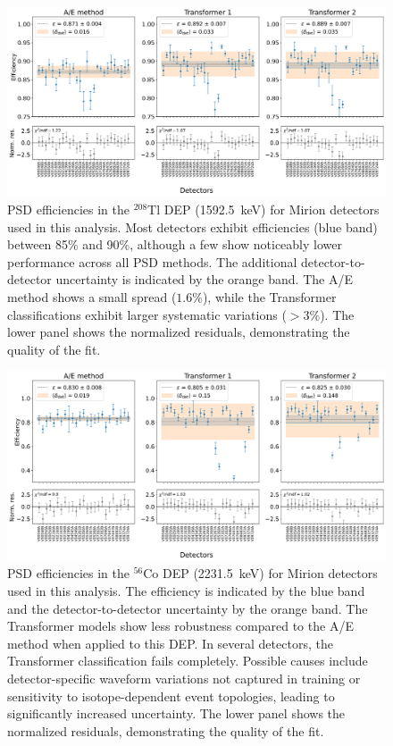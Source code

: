 \begin{figure}
    \centering
    \includegraphics[width=\linewidth]{figures/05_PSD/PSD_eff_DEP_Tl_new.png}
    \caption{PSD efficiencies in the $^{208}$Tl DEP (1592.5~keV) for Mirion detectors used in this analysis. Most detectors exhibit efficiencies (blue band) between 85\% and 90\%, although a few show noticeably lower performance across all PSD methods. The additional detector-to-detector uncertainty is indicated by the orange band. The A/E method shows a small spread ($1.6 \%$), while the Transformer classifications exhibit larger systematic variations ($>3\%$). The lower panel shows the normalized residuals, demonstrating the quality of the fit.} 
\label{fig:psd_dep_Tl}
\end{figure}


\begin{figure}[t]
    \centering
    \includegraphics[width=\linewidth]{figures/05_PSD/PSD_eff_DEP_Co_new.png}
    \caption{PSD efficiencies in the $^{56}$Co DEP (2231.5~keV) for Mirion detectors used in this analysis. The efficiency is indicated by the blue band and the detector-to-detector uncertainty by the orange band. The Transformer models show less robustness compared to the A/E method when applied to this DEP. In several detectors, the Transformer classification fails completely. Possible causes include detector-specific waveform variations not captured in training or sensitivity to isotope-dependent event topologies, leading to significantly increased uncertainty. The lower panel shows the normalized residuals, demonstrating the quality of the fit. } 
\label{fig:psd_dep_Co}
\end{figure} 

